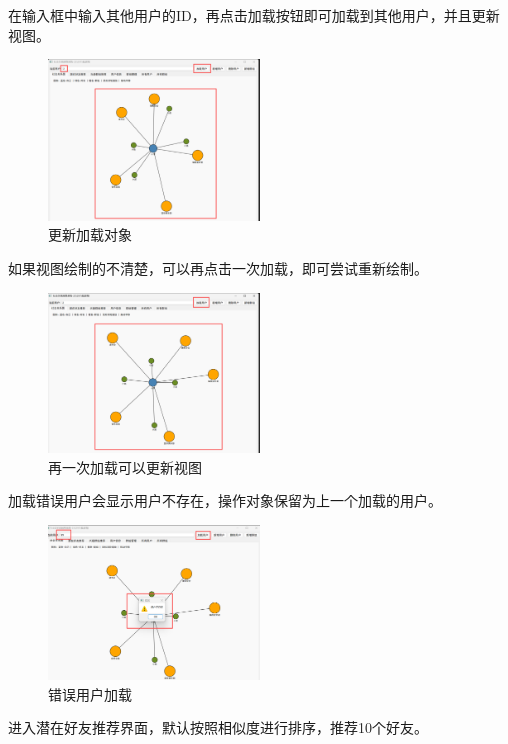 \documentclass[12pt,a4paper]{article}
\begin{document}
在输入框中输入其他用户的ID，再点击加载按钮即可加载到其他用户，并且更新视图。

\begin{figure}[H]
    \centering
    \includegraphics[width=0.5\textwidth]{pt2-11.png}
    \caption{更新加载对象}
\end{figure}

如果视图绘制的不清楚，可以再点击一次加载，即可尝试重新绘制。

\begin{figure}[H]
    \centering
    \includegraphics[width=0.5\textwidth]{pt2-12.png}
    \caption{再一次加载可以更新视图}
\end{figure}

加载错误用户会显示用户不存在，操作对象保留为上一个加载的用户。

\begin{figure}[H]
    \centering
    \includegraphics[width=0.5\textwidth]{pt2-13.png}
    \caption{错误用户加载}
\end{figure}

进入潜在好友推荐界面，默认按照相似度进行排序，推荐10个好友。
\end{document}
